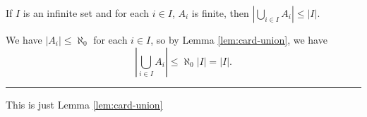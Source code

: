 \begin{exercise}
    If $I$ is an infinite set and for each $i\in I$, $A_i$ is finite, then $\left|\bigcup_{i\in I}A_i\right| \le |I|$.
\end{exercise}
\begin{solution}
    We have $|A_i| \le \aleph_0$ for each $i\in I$, so by Lemma \ref{lem:card-union}, we have $$\left|\bigcup_{i\in I}A_i\right| \le \aleph_0|I| = |I|.$$
\end{solution}
\hrule

\begin{exercise}
    This is just Lemma \ref{lem:card-union}
\end{exercise}